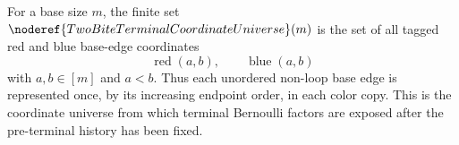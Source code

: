\begin{definition}
For a base size \(m\), the finite set
\(\noderef{TwoBiteTerminalCoordinateUniverse}(m)\) is the set of all tagged
red and blue base-edge coordinates
\[
\operatorname{red}(a,b),\qquad \operatorname{blue}(a,b)
\]
with \(a,b\in[m]\) and \(a<b\).  Thus each unordered non-loop base edge is
represented once, by its increasing endpoint order, in each color copy.  This
is the coordinate universe from which terminal Bernoulli factors are exposed
after the pre-terminal history has been fixed.
\end{definition}
